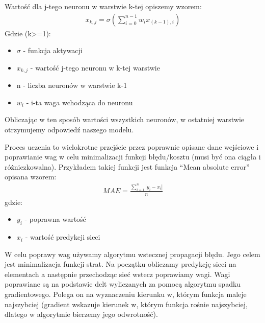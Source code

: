 \documentclass{article}
\begin{document}
Wartość dla j-tego neuronu w warstwie k-tej opiszemy wzorem:
\begin{align*}
    x_{k,j} = \sigma(\sum\limits_{i=0}^{n-1}{w_ix_{(k-1),i}})
\end{align*}
Gdzie (k>=1):
\begin{itemize}
    \item $\sigma$ - funkcja aktywacji
    \item $x_{k,j}$ - wartość j-tego neuronu w k-tej warstwie
    \item n - liczba neuronów w warstwie k-1
    \item $w_i$ - i-ta waga wchodząca do neuronu
\end{itemize}
Obliczając w ten sposób wartości wszystkich neuronów, w ostatniej warstwie otrzymujemy odpowiedź naszego modelu.

Proces uczenia to wielokrotne przejście przez poprawnie opisane dane wejściowe i poprawianie wag w celu minimalizacji funkcji błędu/kosztu (musi być ona ciągła i różniczkowalna).
Przykładem takiej funkcji jest funkcja ``Mean absolute error''\cite{mae-tf} opisana wzorem\cite{mae}:
\begin{align*}
    MAE=\frac{\sum\limits_{i=1}^{n}|{y_i - x_i}|}{n}
\end{align*}
gdzie:
\begin{itemize}
    \item $y_i$ - poprawna wartość
    \item $x_i$ - wartość predykcji sieci
\end{itemize}
W celu poprawy wag używamy algorytmu wstecznej propagacji błędu. Jego celem jest minimalizacja funkcji strat.
Na początku obliczamy predykcję sieci na elementach a następnie przechodząc sieć wstecz poprawiamy wagi.
Wagi poprawiane są na podstawie delt wyliczanych za pomocą algorytmu spadku gradientowego.
Polega on na wyznaczeniu kierunku w, którym funkcja maleje najszybciej (gradient wskazuje kierunek w, którym funkcja rośnie najszybciej, dlatego w algorytmie bierzemy jego odwrotność).
\end{document}
